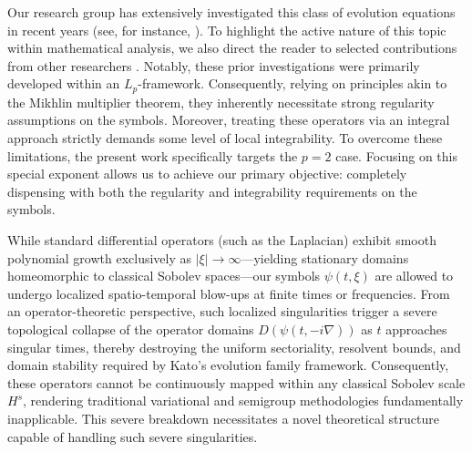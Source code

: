 \documentclass[11pt,reqno]{amsart}
\theoremstyle{definition}
\theoremstyle{remark}
\numberwithin{equation}{section}
\begin{document}
Our research group has extensively investigated this class of evolution equations in recent years (see, for instance, \cite{CJH KID 2023,CJH LJB KID 2023,CJH 2024,KID SBL KHK 2015, KID SBL KHK 2016,KID KHK 2016,KID 2018,KKK0,KKK1}). 
To highlight the active nature of this topic within mathematical analysis, we also direct the reader to selected contributions from other researchers \cite{DHP1,AB1,MP1,Z1,DK1,NVW1,BNVW1}. 
Notably, these prior investigations were primarily developed within an $L_p$-framework. 
Consequently, relying on principles akin to the Mikhlin multiplier theorem, they inherently necessitate strong regularity assumptions on the symbols. 
Moreover, treating these operators via an integral approach strictly demands some level of local integrability. 
To overcome these limitations, the present work specifically targets the $p=2$ case. Focusing on this special exponent allows us to achieve our primary objective: completely dispensing with both the regularity and integrability requirements on the symbols.


While standard differential operators (such as the Laplacian) exhibit smooth polynomial growth exclusively as $\vert{}\xi\vert{} \to \infty$—yielding stationary domains homeomorphic to classical Sobolev spaces—our symbols $\psi(t,\xi)$ are allowed to undergo localized spatio-temporal blow-ups at finite times or frequencies. 
From an operator-theoretic perspective, such localized singularities trigger a severe topological collapse of the operator domains $D(\psi(t,-i\nabla))$ as $t$ approaches singular times, thereby destroying the uniform sectoriality, resolvent bounds, and domain stability required by Kato's evolution family framework. 
Consequently, these operators cannot be continuously mapped within any classical Sobolev scale $H^s$, rendering traditional variational and semigroup methodologies fundamentally inapplicable.
This severe breakdown necessitates a novel theoretical structure capable of handling such severe singularities.
\end{document}
